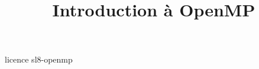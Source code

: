 \documentclass [xcolor=table] {beamer}
\title {Introduction à OpenMP}
\begin{document}
 {licence}
 {sl8-openmp}
\end{document}
